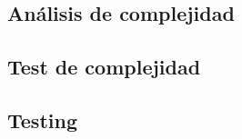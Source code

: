 \subsection{An\'alisis de complejidad}

\subsection{Test de complejidad}

\subsection{Testing}































